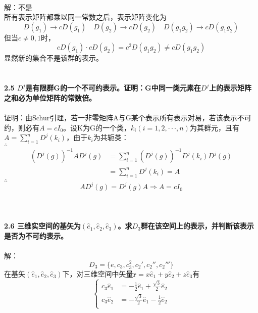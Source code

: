 \documentclass[12pt]{article}
\numberwithin{equation}{section}	 %
\begin{document}
\begin{spacing}{1.5}
~\\
解：不是\\
所有表示矩阵都乘以同一常数之后，表示矩阵变化为
\begin{equation}\nonumber 		%
D(g_{1})\rightarrow cD(g_{1}) \quad D(g_{2})\rightarrow cD(g_{2}) \quad D(g_{1}g_{2})\rightarrow cD(g_{1}g_{2})
\end{equation}
但当$c \ne 0,1$时，
\begin{equation}
cD(g_{1}) \cdot cD(g_{2}) = c^{2}D(g_{1}g_{2}) \ne cD(g_{1}g_{2})
\end{equation}
显然新的集合不是该群的表示。
~\\
~\\
~\\
\textbf{2.5 \quad $D^{j}$是有限群G的一个不可约表示。证明：G中同一类元素在$D^{j}$上的表示矩阵之和必为单位矩阵的常数倍。}\\
~\\
证明：由Schur引理，若一非零矩阵A与G某个表示所有表示对易，若该表示不可约，则必有$A=cI_{0}$。设K为G的一个类，$k_{i} (i=1,2,\cdot\cdot\cdot,n)$为其群元，且有$\displaystyle A=\sum_{i=1}^{n}D^{j}(k_{i})$，由于$k_{i}$为共轭类：\\
$\therefore$
\begin{align*}
(D^{j}(g))^{-1}AD^{j}(g) &= \sum_{i=1}^{n} (D^{j}(g))^{-1}D^{j}(k_{i})D^{j}(g) \\
&= \sum_{i=1}^{n}D^{j}(k_{i}) = A
\end{align*}
$\therefore$
\begin{equation}
AD^{j}(g) = D^{j}(g)A \Longrightarrow A=cI_{0}
\end{equation}
~\\
~\\
~\\
\textbf{2.6 \quad 三维实空间的基矢为$(\hat{e}_{1}, \hat{e}_{2}, \hat{e}_{3})$。求$D_{3}$群在该空间上的表示，并判断该表示是否为不可约表示。}\\
~\\
解：
\begin{equation}
D_{3} = \{ e,c_{3},c_{3}^{2},c_{2}',c_{2}'',c_{2}''' \}
\end{equation}
在基矢$(\hat{e}_{1}, \hat{e}_{2}, \hat{e}_{3})$下，对三维空间中矢量$\bm{r} = x\hat{e}_{1}+y\hat{e}_{2}+z\hat{e}_{3}$有
\begin{equation}
\left\{		%
\begin{aligned}
c_{3}\hat{e}_{1} &= -\frac{1}{2}\hat{e}_{1} + \frac{\sqrt{3}}{2}\hat{e}_{2} \\
c_{3}\hat{e}_{2} &= -\frac{\sqrt{3}}{2}\hat{e}_{1} - \frac{1}{2}\hat{e}_{2}\\

\end{aligned}
\end{equation}
\end{spacing}
\end{document}
